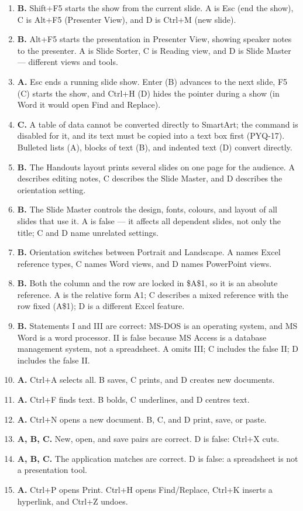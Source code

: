 \begin{enumerate}[label=\textbf{Q\arabic*.}, leftmargin=*]
  renames or edits a cell.
\item \textbf{B.} Shift+F5 starts the show from the current slide. A is Esc
  (end the show), C is Alt+F5 (Presenter View), and D is Ctrl+M (new slide).
\item \textbf{B.} Alt+F5 starts the presentation in Presenter View, showing
  speaker notes to the presenter. A is Slide Sorter, C is Reading view, and D
  is Slide Master --- different views and tools.
\item \textbf{A.} Esc ends a running slide show. Enter (B) advances to the next
  slide, F5 (C) starts the show, and Ctrl+H (D) hides the pointer during a
  show (in Word it would open Find and Replace).
\item \textbf{C.} A table of data cannot be converted directly to SmartArt; the
  command is disabled for it, and its text must be copied into a text box
  first (PYQ-17). Bulleted lists (A), blocks of text (B), and indented text
  (D) convert directly.
\item \textbf{B.} The Handouts layout prints several slides on one page for the
  audience. A describes editing notes, C describes the Slide Master, and D
  describes the orientation setting.
\item \textbf{B.} The Slide Master controls the design, fonts, colours, and
  layout of all slides that use it. A is false --- it affects all dependent
  slides, not only the title; C and D name unrelated settings.
\item \textbf{B.} Orientation switches between Portrait and Landscape. A names
  Excel reference types, C names Word views, and D names PowerPoint views.
\item \textbf{B.} Both the column and the row are locked in \$A\$1, so it is an
  absolute reference. A is the relative form A1; C describes a mixed reference
  with the row fixed (A\$1); D is a different Excel feature.
\item \textbf{B.} Statements I and III are correct: MS-DOS is an operating
  system, and MS Word is a word processor. II is false because MS Access is a
  database management system, not a spreadsheet. A omits III; C includes the
  false II; D includes the false II.

\item \textbf{A.} Ctrl+A selects all. B saves, C prints, and D creates new documents.
\item \textbf{A.} Ctrl+F finds text. B bolds, C underlines, and D centres text.
\item \textbf{A.} Ctrl+N opens a new document. B, C, and D print, save, or paste.
\item \textbf{A, B, C.} New, open, and save pairs are correct. D is false: Ctrl+X cuts.
\item \textbf{A, B, C.} The application matches are correct. D is false: a spreadsheet is not a presentation tool.
\item \textbf{A.} Ctrl+P opens Print. Ctrl+H opens Find/Replace, Ctrl+K inserts a hyperlink, and Ctrl+Z undoes.


\end{enumerate}
